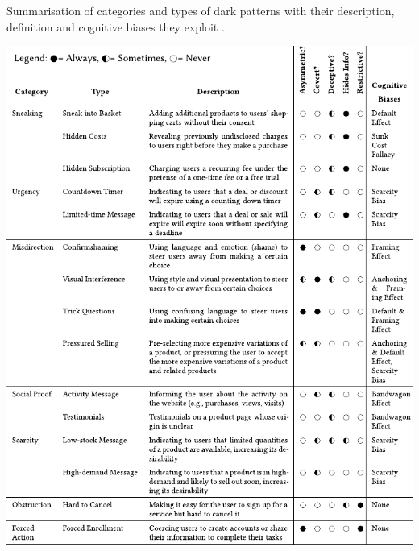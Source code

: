 \begin{table}
    \centering
    \caption{Summarisation of categories and types of dark patterns with their description, definition and cognitive biases they exploit \cite{dark-patterns-at-scale}.}\label{tab:darkpatterns}
    \includegraphics[width=1\textwidth]{media/dp-table.pdf}
\end{table}